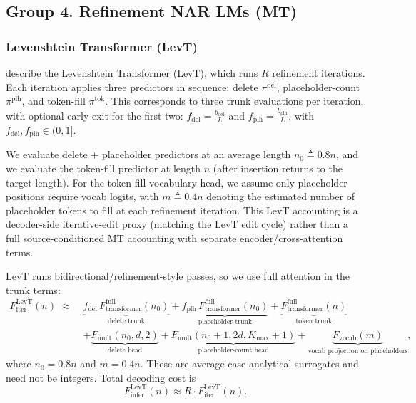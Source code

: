 \documentclass[11pt]{article}
\begin{document}
\subsection{Group 4. Refinement NAR LMs (MT)}
\subsubsection{Levenshtein Transformer (LevT)}
\citet{gu2019levenshtein} describe the Levenshtein Transformer (LevT), which runs $R$ refinement iterations. Each iteration applies three predictors in sequence: delete $\pi^{\text{del}}$, placeholder-count $\pi^{\text{plh}}$, and token-fill $\pi^{\text{tok}}$. This corresponds to three trunk evaluations per iteration, with optional early exit for the first two:
$f_{\text{del}}=\frac{b_{\text{del}}}{L}$ and $f_{\text{plh}}=\frac{b_{\text{plh}}}{L}$, with $f_{\text{del}},f_{\text{plh}}\in(0,1]$.

We evaluate delete + placeholder predictors at an average length
$n_0 \triangleq 0.8n$, and we evaluate the token-fill predictor at length $n$ (after insertion returns to the target length). For the token-fill vocabulary head, we assume only placeholder positions require vocab logits, with $m \triangleq 0.4n$ denoting the estimated number of placeholder tokens to fill at each refinement iteration.
This LevT accounting is a decoder-side iterative-edit proxy (matching the LevT edit cycle) rather than a full source-conditioned MT accounting with separate encoder/cross-attention terms.

LevT runs bidirectional/refinement-style passes, so we use full attention in the trunk terms:
\[
\begin{aligned}
F_{\text{iter}}^{\text{LevT}}(n)
\;\approx\;
&\underbrace{f_{\text{del}}\,F_{\text{transformer}}^{\text{full}}(n_0)}_{\text{delete trunk}}
+\underbrace{f_{\text{plh}}\,F_{\text{transformer}}^{\text{full}}(n_0)}_{\text{placeholder trunk}}
+\underbrace{F_{\text{transformer}}^{\text{full}}(n)}_{\text{token trunk}}\\
&+\underbrace{F_{\text{mult}}(n_0,d,2)}_{\text{delete head}}
+\underbrace{F_{\text{mult}}(n_0+1,2d,K_{\max}+1)}_{\text{placeholder-count head}}
+\underbrace{F_{\text{vocab}}(m)}_{\text{vocab projection on placeholders}},
\end{aligned}
\]
where $n_0=0.8n$ and $m=0.4n$. These are average-case analytical surrogates and need not be integers. Total decoding cost is
\[
F_{\text{infer}}^{\text{LevT}}(n)\approx R\cdot F_{\text{iter}}^{\text{LevT}}(n).
\]
\end{document}
